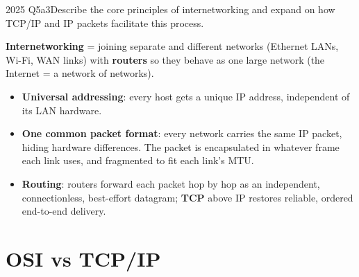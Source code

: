 \documentclass[10pt]{article}
\begin{document}
\begin{pastq}{2025 Q5a}{3}Describe the core principles of internetworking and expand on how TCP/IP and IP packets facilitate this process.\end{pastq}
\begin{ans}
\textbf{Internetworking} = joining separate and different networks (Ethernet LANs, Wi-Fi, WAN links) with \textbf{routers} so they behave as one large network (the Internet = a network of networks).
\begin{itemize}
\item \textbf{Universal addressing}: every host gets a unique IP address, independent of its LAN hardware.
\item \textbf{One common packet format}: every network carries the same IP packet, hiding hardware differences. The packet is encapsulated in whatever frame each link uses, and fragmented to fit each link's MTU.
\item \textbf{Routing}: routers forward each packet hop by hop as an independent, connectionless, best-effort datagram; \textbf{TCP} above IP restores reliable, ordered end-to-end delivery.
\end{itemize}
\end{ans}

\section{OSI vs TCP/IP}
\end{document}
